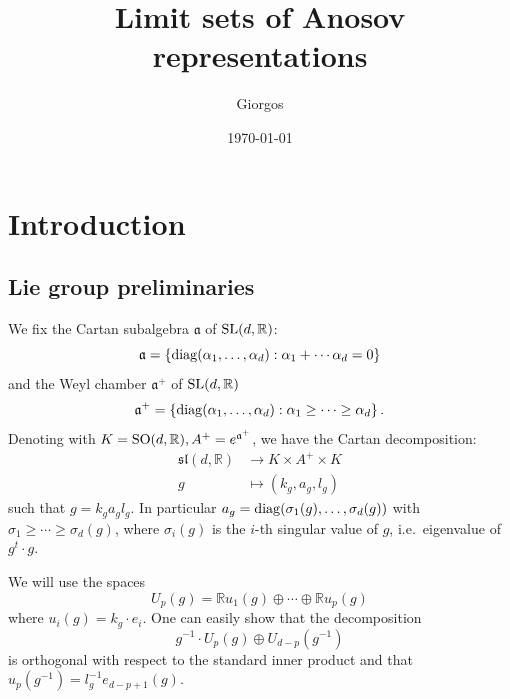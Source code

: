 \documentclass{report}
\title{Limit sets of Anosov representations}
\author{Giorgos}
\date{\today}
\begin{document}
\maketitle

\tableofcontents

\chapter{Introduction}
\section{Lie group preliminaries}
We fix the Cartan subalgebra $\mathfrak a$ of $\operatorname{{\mathrm{SL}}}(d,\mathbb R)$:
\[
    \mathfrak a = \left\{
        \operatorname{diag}(\alpha_1, \ldots, \alpha_d) : \alpha_1 + \cdots \alpha_d = 0
    \right\}
\]
and the Weyl chamber $\mathfrak a^+$ of $\operatorname{{\mathrm{SL}}}(d,\mathbb R)$
\[
    \mathfrak a^+ = \left\{
        \operatorname{diag}(\alpha_1, \ldots, \alpha_d) : \alpha_1 \geq \cdots \geq \alpha_d
    \right\}.
\]
Denoting with $K = \operatorname{{\mathrm{SO}}}(d, \mathbb R), A^+ = e^{\mathfrak a^+} $, we have the Cartan decomposition:
\begin{align*}
    \mathfrak{sl}(d, \mathbb R) &\rightarrow K \times A^+ \times K\\
    g &\mapsto (k_g, a_g, l_g) 
\end{align*}
such that $g = k_g a_g l_g$.
In particular $a_g = \operatorname{diag}(\sigma_1(g), \ldots, \sigma_d(g))$ with $\sigma_1 \geq \cdots \geq \sigma_d(g)$,
where $\sigma_i(g)$ is the $i$-th singular value of $g$, i.e.\ eigenvalue of $g^t \cdot g$.

We will use the spaces
\[
    U_p(g) = \mathbb R u_1(g) \oplus \cdots \oplus \mathbb R u_p(g)   
\]
where $u_i(g) = k_g \cdot e_i$.
One can easily show that the decomposition
\[
    g^{-1} \cdot U_p(g) \oplus U_{d-p}(g^{-1})
\]
is orthogonal with respect to the standard inner product and that
$u_p(g^{-1}) = l_g^{-1} e_{d-p+1}(g).$
\end{document}
